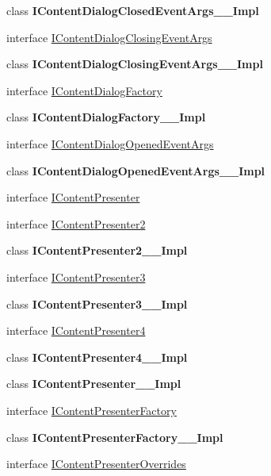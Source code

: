 \begin{DoxyCompactItemize}
\item 
class {\bfseries I\+Content\+Dialog\+Closed\+Event\+Args\+\_\+\+\_\+\+Impl}
\item 
interface \hyperlink{interface_windows_1_1_u_i_1_1_xaml_1_1_controls_1_1_i_content_dialog_closing_event_args}{I\+Content\+Dialog\+Closing\+Event\+Args}
\item 
class {\bfseries I\+Content\+Dialog\+Closing\+Event\+Args\+\_\+\+\_\+\+Impl}
\item 
interface \hyperlink{interface_windows_1_1_u_i_1_1_xaml_1_1_controls_1_1_i_content_dialog_factory}{I\+Content\+Dialog\+Factory}
\item 
class {\bfseries I\+Content\+Dialog\+Factory\+\_\+\+\_\+\+Impl}
\item 
interface \hyperlink{interface_windows_1_1_u_i_1_1_xaml_1_1_controls_1_1_i_content_dialog_opened_event_args}{I\+Content\+Dialog\+Opened\+Event\+Args}
\item 
class {\bfseries I\+Content\+Dialog\+Opened\+Event\+Args\+\_\+\+\_\+\+Impl}
\item 
interface \hyperlink{interface_windows_1_1_u_i_1_1_xaml_1_1_controls_1_1_i_content_presenter}{I\+Content\+Presenter}
\item 
interface \hyperlink{interface_windows_1_1_u_i_1_1_xaml_1_1_controls_1_1_i_content_presenter2}{I\+Content\+Presenter2}
\item 
class {\bfseries I\+Content\+Presenter2\+\_\+\+\_\+\+Impl}
\item 
interface \hyperlink{interface_windows_1_1_u_i_1_1_xaml_1_1_controls_1_1_i_content_presenter3}{I\+Content\+Presenter3}
\item 
class {\bfseries I\+Content\+Presenter3\+\_\+\+\_\+\+Impl}
\item 
interface \hyperlink{interface_windows_1_1_u_i_1_1_xaml_1_1_controls_1_1_i_content_presenter4}{I\+Content\+Presenter4}
\item 
class {\bfseries I\+Content\+Presenter4\+\_\+\+\_\+\+Impl}
\item 
class {\bfseries I\+Content\+Presenter\+\_\+\+\_\+\+Impl}
\item 
interface \hyperlink{interface_windows_1_1_u_i_1_1_xaml_1_1_controls_1_1_i_content_presenter_factory}{I\+Content\+Presenter\+Factory}
\item 
class {\bfseries I\+Content\+Presenter\+Factory\+\_\+\+\_\+\+Impl}
\item 
interface \hyperlink{interface_windows_1_1_u_i_1_1_xaml_1_1_controls_1_1_i_content_presenter_overrides}{I\+Content\+Presenter\+Overrides}

\end{DoxyCompactItemize}
